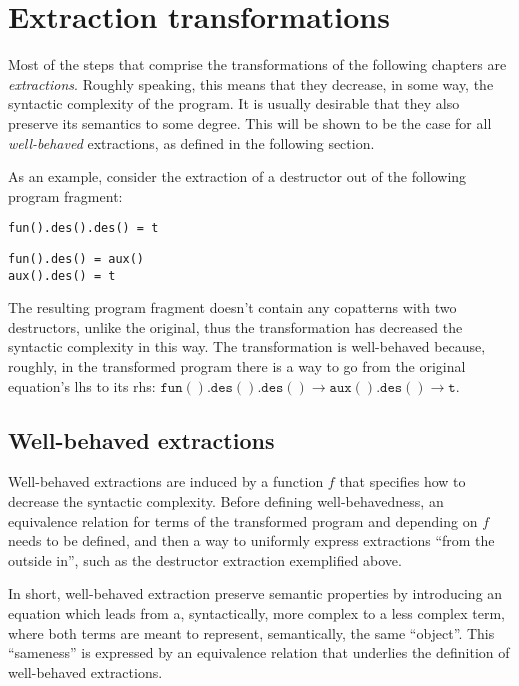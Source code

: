 \chapter{Extraction transformations}

Most of the steps that comprise the transformations of the following chapters are \textit{extractions}. Roughly speaking, this means that they decrease, in some way, the syntactic complexity of the program. It is usually desirable that they also preserve its semantics to some degree. This will be shown to be the case for all \textit{well-behaved} extractions, as defined in the following section.

As an example, consider the extraction of a destructor out of the following program fragment:
\begin{lstlisting}
fun().des().des() = t
\end{lstlisting}

\begin{lstlisting}
fun().des() = aux()
aux().des() = t
\end{lstlisting}
The resulting program fragment doesn't contain any copatterns with two destructors, unlike the original, thus the transformation has decreased the syntactic complexity in this way. The transformation is well-behaved because, roughly, in the transformed program there is a way to go from the original equation's lhs to its rhs: $\mathtt{fun().des().des()} \longrightarrow \mathtt{aux().des()} \longrightarrow \mathtt{t}$.

\section{Well-behaved extractions}

Well-behaved extractions are induced by a function $f$ that specifies how to decrease the syntactic complexity. Before defining well-behavedness, an equivalence relation for terms of the transformed program and depending on $f$ needs to be defined, and then a way to uniformly express extractions ``from the outside in'', such as the destructor extraction exemplified above.

In short, well-behaved extraction preserve semantic properties by introducing an equation which leads from a, syntactically, more complex to a less complex term, where both terms are meant to represent, semantically, the same ``object''. This ``sameness'' is expressed by an equivalence relation that underlies the definition of well-behaved extractions.

